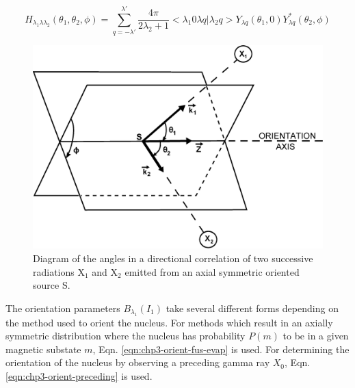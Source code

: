 \begin{equation}
\label{eqn:chp3-angular-function}
H_{\lambda{}_1\lambda{}\lambda{}_2}\left(\theta{}_1,\theta{}_2,\phi{}\right) = \sum\limits_{q=-\lambda{}'}^{\lambda{}'}\frac{4 \pi{}}{2\lambda{}_2 +1} <\lambda{}_1 0 \lambda{} q | \lambda{}_2 q> Y_{\lambda{}q}\left(\theta{}_1,0\right) Y^{*}_{\lambda{}q}\left(\theta{}_2,\phi{}\right)
\end{equation}

\begin{figure}[h!]
	\centerline{\includegraphics[height=0.35\textheight]{./img/c3/dco_setup.eps}}
	\caption{Diagram of the angles in a directional correlation of two successive radiations X$_{1}$ and X$_{2}$ emitted from an axial symmetric oriented source S.}
	\label{fig:chp3-DCO-Angles}
\end{figure}

The orientation parameters $B_{\lambda{}_1}\left(I_1\right)$ take several different forms depending on the method used to orient the nucleus. For methods which result in an axially symmetric distribution where the nucleus has probability $P(m)$ to be in a given magnetic substate $m$, Eqn. \ref{eqn:chp3-orient-fus-evap} is used. For determining the orientation of the nucleus by observing a preceding gamma ray $X_0$, Eqn. \ref{eqn:chp3-orient-preceding} is used.

